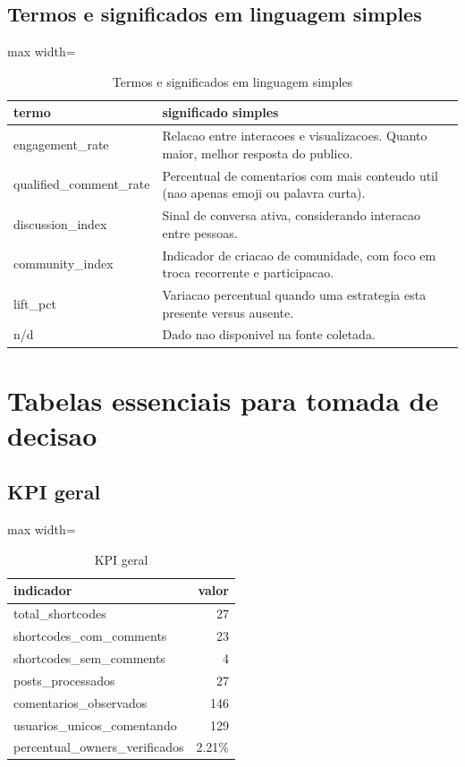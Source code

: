 \documentclass[12pt,a4paper]{article}
\begin{document}
\subsection{Termos e significados em linguagem simples}
\begin{table}[H]
\centering
\scriptsize
\begin{adjustbox}{max width=\textwidth}
\begin{tabular}{l l}
\toprule
termo & significado simples \\
\midrule
engagement\_rate & Relacao entre interacoes e visualizacoes. Quanto maior, melhor resposta do publico. \\
qualified\_comment\_rate & Percentual de comentarios com mais conteudo util (nao apenas emoji ou palavra curta). \\
discussion\_index & Sinal de conversa ativa, considerando interacao entre pessoas. \\
community\_index & Indicador de criacao de comunidade, com foco em troca recorrente e participacao. \\
lift\_pct & Variacao percentual quando uma estrategia esta presente versus ausente. \\
n/d & Dado nao disponivel na fonte coletada. \\
\bottomrule
\end{tabular}
\end{adjustbox}
\caption{Termos e significados em linguagem simples}
\label{tab:glossario}
\end{table}

\section{Tabelas essenciais para tomada de decisao}
\subsection{KPI geral}
\begin{table}[H]
\centering
\scriptsize
\begin{adjustbox}{max width=\textwidth}
\begin{tabular}{l r}
\toprule
indicador & valor \\
\midrule
total\_shortcodes & 27 \\
shortcodes\_com\_comments & 23 \\
shortcodes\_sem\_comments & 4 \\
posts\_processados & 27 \\
comentarios\_observados & 146 \\
usuarios\_unicos\_comentando & 129 \\
percentual\_owners\_verificados & 2.21\% \\
\bottomrule
\end{tabular}
\end{adjustbox}
\caption{KPI geral}
\label{tab:kpi}
\end{table}
\end{document}
